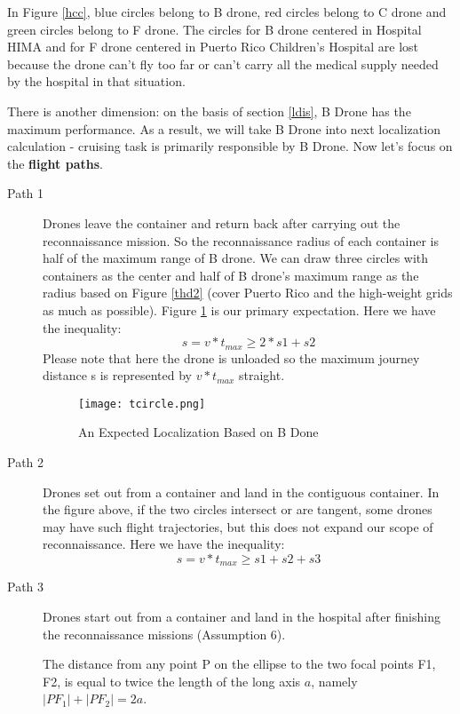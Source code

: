 \documentclass{mcmthesis}
\begin{document}
	In Figure \ref{hcc}, blue circles belong to B drone, red circles belong to C drone and green circles belong to F drone. The circles for B drone centered in Hospital HIMA and for F drone centered in Puerto Rico Children's Hospital are lost because the drone can't fly too far or can't carry all the medical supply needed by the hospital in that situation.
	\par
	There is another dimension: on the basis of section \ref{ldis}, B Drone has the maximum performance. As a result, we will take B Drone into next localization calculation - cruising task is primarily responsible by B Drone. Now let's focus on the \textbf{flight paths}.
	\par
	\begin{description}
		\item[Path 1] Drones leave the container and return back after carrying out the reconnaissance mission. So the reconnaissance radius of each container is half of the maximum range of B drone. We can draw three circles with containers as the center and half of B drone's maximum range as the radius based on Figure \ref{thd2} (cover Puerto Rico and the high-weight grids as much as possible). Figure \ref{circle3} is our primary expectation.
		Here we have the inequality:
		\begin{equation}
		s=v*t_{max} \ge 2*s1 + s2   
		\end{equation}  
		Please note that here the drone is unloaded so the maximum journey distance s is represented by $v*t_{max}$ straight. 
		
		  \begin{figure}[H]                                         
			\centering
			\texttt{[image: tcircle.png]}        
			\caption{An Expected Localization Based on B Done}                           
			\label{circle3}                                          
		\end{figure}
		 \item[Path 2] Drones set out from a container and land in the contiguous container. In the figure above, if the two circles intersect or are tangent, some drones may have such flight trajectories, but this does not expand our scope of reconnaissance. Here we have the inequality:
		 		\begin{equation}
		 s=v*t_{max} \ge s1 + s2 + s3  
		 \end{equation}  
		 
		 \item[Path 3] Drones start out from a container and land in the hospital after finishing the reconnaissance missions (Assumption 6).  
		 \begin{Theorem} \label{thm:latex}
		 	The distance from any point P on the ellipse to the two focal points F1, F2, is equal to twice the length of the long axis $a$, namely $|PF_1|+|PF_2|=2a$.
		 \end{Theorem}
	 

\end{description}
\end{document}
